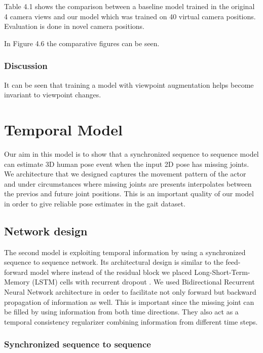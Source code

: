 Table 4.1 shows the comparison between a baseline model trained in the original 4 camera views and our model which was trained on 40 virtual camera positions. Evaluation is done in novel camera positions.

In Figure 4.6 the comparative figures can be seen. 

\subsubsection{Discussion}

It can be seen that training a model with viewpoint augmentation helps become invariant to viewpoint changes.


\section{Temporal Model}

Our aim in this model is to show that a synchronized sequence to sequence model can estimate 3D human pose event when the input 2D pose has missing joints. We architecture that we designed captures the movement pattern of the actor and under circumstances where missing joints are presents interpolates between the previos and future joint positions. This is an important quality of our model in order to give reliable pose estimates in the gait dataset. 

\subsection{Network design}

The second model is exploiting temporal information by using a synchronized sequence to sequence network. Its architectural design is similar to the feed-forward model where instead of the residual block we placed Long-Short-Term-Memory (LSTM) \parencite{hochreiter1997long} cells with recurrent dropout \parencite{semeniuta2016recurrent}. We used Bidirectional Recurrent Neural Network \parencite{schuster1997bidirectional} architecture in order to facilitate not only forward but backward propagation of information as well. This is important since the missing joint can be filled by using 
information from both time directions. They also act as a temporal consistency regularizer combining information from different time steps.

\subsubsection{Synchronized sequence to sequence}


